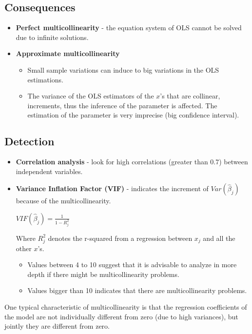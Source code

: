 \documentclass[10pt, a4paper, landscape]{extarticle}
\begin{document}
\begin{multicols}{3}
\subsection*{Consequences}

\begin{itemize}[leftmargin=*]
\item \textbf{Perfect multicollinearity} - the equation system of OLS cannot be solved due to infinite solutions.
\item \textbf{Approximate multicollinearity}
\begin{itemize}[leftmargin=*]
\item Small sample variations can induce to big variations in the OLS estimations.
\item The variance of the OLS estimators of the $x$'s that are collinear, increments, thus the inference of the parameter is affected. The estimation of the parameter is very imprecise (big confidence interval).
\end{itemize}
\end{itemize}

\subsection*{Detection}

\begin{itemize}[leftmargin=*]
\item \textbf{Correlation analysis} - look for high correlations (greater than 0.7) between independent variables.
\item \textbf{Variance Inflation Factor (VIF)} - indicates the increment of $Var(\hat{\beta}_j)$ because of the multicollinearity.
\begin{center}
$VIF(\hat{\beta}_j) = \frac{1}{1-R_j^2}$
\end{center}
Where $R^2_j$ denotes the r-squared from a regression between $x_j$ and all the other $x$'s. 
\begin{itemize}[leftmargin=*]
\item Values between 4 to 10 suggest that it is advisable to analyze in more depth if there might be multicollinearity problems.
\item Values bigger than 10 indicates that there are multicollinearity problems.
\end{itemize}
\end{itemize}

One typical characteristic of multicollinearity is that the regression coefficients of the model are not individually different from zero (due to high variances), but jointly they are different from zero.


\end{multicols}
\end{document}
